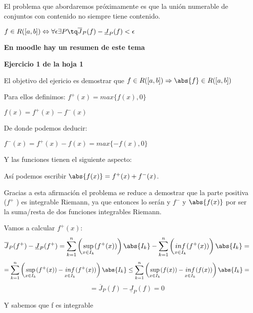 \documentclass{apuntes}
\begin{document}
El problema que abordaremos próximamente es que la unión numerable de conjuntos con contenido no siempre tiene contenido.

\obs $f\in R([a,b]) \Leftrightarrow \forall \epsilon \exists P \tq \overline{J}_P(f)-\underline{J}_P(f) < \epsilon$


\textbf{En moodle hay un resumen de este tema}

\begin{example}
\textbf{Ejercicio 1 de la hoja 1}

El objetivo del ejericio es demostrar que $f\in R([a,b]) \Rightarrow \abs{f}\in R([a,b])$

Para ellos definimos: 
$f^+(x) = max\lbrace f(x), 0 \rbrace$

$f(x) = f^+(x) - f^-(x)$

De donde podemos deducir:

$f^-(x) = f^+(x)-f(x)=max \lbrace -f(x), 0 \rbrace$

Y las funciones tienen el siguiente aspecto:

\begin{center}
\end{center}


Así podemos escribir 
$\abs{f(x)} = f^+(x)+f^-(x)$.

Gracias a esta afirmación el problema se reduce a demostrar que la parte positiva ($f^+$ ) es integrable Riemann, ya que entonces lo serán  y $f^-$  y $\abs{f(x)}$  por ser la suma/resta de dos funciones integrables Riemann.


Vamos a calcular $f^+(x)$:
\[\overline{J}_P(f^+)-\underline{J}_P(f^+) = \sum_{k=1}^n\left(\sup_{x\in I_k}(f^+(x))\right)\abs{I_k} - \sum_{k=1}^n\left(\underset{x\in I_k}{inf}(f^+(x))\right)\abs{I_k}=\]
\[= \sum_{k=1}^n\left(\sup_{x\in I_k}(f^+(x))-\underset{x\in I_k}{inf}(f^+(x))\right)\abs{I_k} \leq
\sum_{k=1}^n\left(\sup_{x\in I_k}(f(x))-\underset{x\in I_k}{inf}(f(x))\right)\abs{I_k} =\] \[=\overline{J}_P(f)-\underline{J}_P(f) = 0\]

Y sabemos que f es integrable
\end{example}
\end{document}
